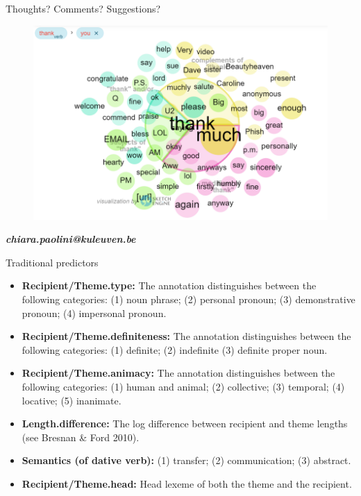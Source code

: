 \documentclass[
  ignorenonframetext,
]{beamer}
\begin{document}
\begin{frame}{Thoughts? Comments? Suggestions?}
\protect\hypertarget{thoughts-comments-suggestions}{}
\begin{figure}

{\centering \includegraphics[width=7.05208in,height=\textheight]{images/thank_you.png}

}

\end{figure}

\textbf{\emph{chiara.paolini@kuleuven.be}}
\end{frame}

\begin{frame}{Traditional predictors}
\protect\hypertarget{traditional-predictors}{}
\begin{itemize}
\item
  \textbf{Recipient/Theme.type:} The annotation distinguishes between
  the following categories: (1) noun phrase; (2) personal pronoun; (3)
  demonstrative pronoun; (4) impersonal pronoun.
\item
  \textbf{Recipient/Theme.definiteness:} The annotation distinguishes
  between the following categories: (1) definite; (2) indefinite (3)
  definite proper noun.
\item
  \textbf{Recipient/Theme.animacy:} The annotation distinguishes between
  the following categories: (1) human and animal; (2) collective; (3)
  temporal; (4) locative; (5) inanimate.
\item
  \textbf{Length.difference:} The log difference between recipient and
  theme lengths (see Bresnan \& Ford 2010).
\item
  \textbf{Semantics (of dative verb):} (1) transfer; (2) communication;
  (3) abstract.
\item
  \textbf{Recipient/Theme.head:} Head lexeme of both the theme and the
  recipient.
\end{itemize}
\end{frame}
\end{document}
